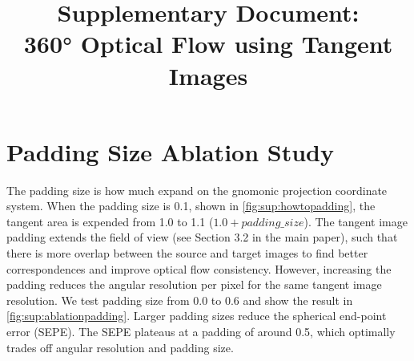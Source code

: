 \documentclass{bmvc2k}
\title{Supplementary Document:\\ 360\!° Optical Flow using Tangent Images}
\newcommand{\TODO}[1]{\textcolor{red}{{[TODO: #1]}}}
\begin{document}
\maketitle

%
%


%
%


\section{Padding Size Ablation Study}
\label{sec:sup:ablations}

The padding size is how much expand on the gnomonic projection coordinate system.
When the padding size is 0.1, shown in \cref{fig:sup:howtopadding}, the tangent area is expended from 1.0 to 1.1 ($1.0  + padding\_size$).
The tangent image padding extends the field of view  (see Section 3.2 in the main paper), such that there is more overlap between the source and target images to find better correspondences and improve optical flow consistency.
%
However, increasing the padding reduces the angular resolution per pixel for the same tangent image resolution.
%
We test padding size from 0.0 to 0.6 and show the result in \cref{fig:sup:ablationpadding}.
Larger padding sizes reduce the spherical end-point error (SEPE).
The SEPE plateaus at a padding of around 0.5, which optimally trades off angular resolution and padding size.
\end{document}
